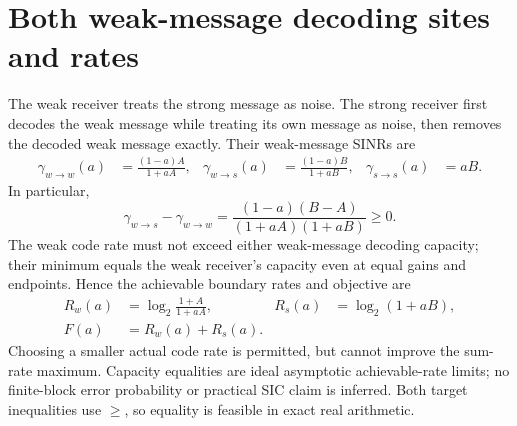\documentclass[11pt]{article}
\begin{document}
\section{Both weak-message decoding sites and rates}
The weak receiver treats the strong message as noise. The strong receiver
first decodes the weak message while treating its own message as noise,
then removes the decoded weak message exactly. Their weak-message SINRs are
\begin{align}
 \gamma_{w\to w}(a)&=\frac{(1-a)A}{1+aA}, &
 \gamma_{w\to s}(a)&=\frac{(1-a)B}{1+aB}, &
 \gamma_{s\to s}(a)&=aB.
\end{align}
In particular,
\begin{equation}
 \gamma_{w\to s}-\gamma_{w\to w}
 =\frac{(1-a)(B-A)}{(1+aA)(1+aB)}\geq0.
\end{equation}
The weak code rate must not exceed either weak-message decoding capacity;
their minimum equals the weak receiver's capacity even at equal gains and
endpoints. Hence the achievable boundary rates and objective are
\begin{align}
 R_w(a)&=\log_2\frac{1+A}{1+aA}, &R_s(a)&=\log_2(1+aB),\\
 F(a)&=R_w(a)+R_s(a).
\end{align}
Choosing a smaller actual code rate is permitted, but cannot improve the
sum-rate maximum. Capacity equalities are ideal asymptotic achievable-rate
limits; no finite-block error probability or practical SIC claim is inferred.
Both target inequalities use \(\geq\), so equality is feasible in exact
real arithmetic.
\end{document}
